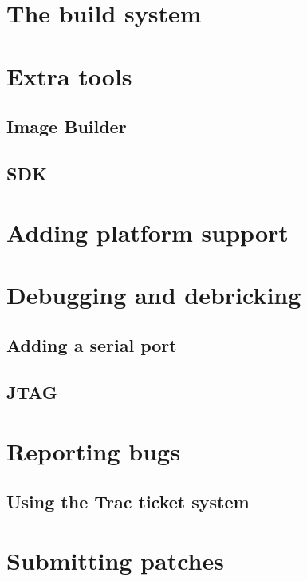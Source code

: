 \documentclass[a4paper]{book}
\begin{document}
  \section{The build system}
    
  \section{Extra tools}
    \subsection{Image Builder}
    \subsection{SDK}
  \section{Adding platform support}
     
  \section{Debugging and debricking}
    \subsection{Adding a serial port}
    \subsection{JTAG}
   \section{Reporting bugs}
	\subsection{Using the Trac ticket system}
	
   \section{Submitting patches}
    
\end{document}
